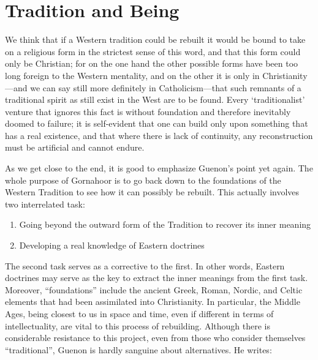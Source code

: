 \section{Tradition and Being}

\begin{quotex}
We think that if a Western tradition could be rebuilt it would be bound to take on a religious form in the strictest sense of this word, and that this form could only be Christian; for on the one hand the other possible forms have been too long foreign to the Western mentality, and on the other it is only in Christianity---and we can say still more definitely in Catholicism---that such remnants of a traditional spirit as still exist in the West are to be found. Every `traditionalist' venture that ignores this fact is without foundation and therefore inevitably doomed to failure; it is self-evident that one can build only upon something that has a real existence, and that where there is lack of continuity, any reconstruction must be artificial and cannot endure.
\end{quotex}


As we get close to the end, it is good to emphasize Guenon's point yet again. The whole purpose of Gornahoor is to go back down to the foundations of the Western Tradition to see how it can possibly be rebuilt. This actually involves two interrelated task:

\begin{enumerate}


\item Going beyond the outward form of the Tradition to recover its inner meaning

\item Developing a real knowledge of Eastern doctrines
\end{enumerate}


The second task serves as a corrective to the first. In other words, Eastern doctrines may serve as the key to extract the inner meanings from the first task. Moreover, ``foundations'' include the ancient Greek, Roman, Nordic, and Celtic elements that had been assimilated into Christianity. In particular, the Middle Ages, being closest to us in space and time, even if different in terms of intellectuality, are vital to this process of rebuilding. Although there is considerable resistance to this project, even from those who consider themselves ``traditional'', Guenon is hardly sanguine about alternatives. He writes:

